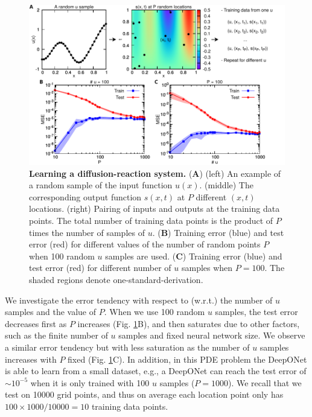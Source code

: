 \documentclass[11pt]{article}
\begin{document}
\begin{figure}[htbp]
\centering
\includegraphics{adr_error.pdf}
\caption{\textbf{Learning a diffusion-reaction system.} (\textbf{A}) (left) An example of a random sample of the input function $u(x)$. (middle) The corresponding output function $s(x,t)$ at $P$ different $(x,t)$ locations. (right) Pairing of inputs and outputs at the training data points. The total number of training data points is the product of $P$ times the number of samples of $u$. (\textbf{B}) Training error (blue) and test error (red) for different values of the number of random points $P$ when 100 random $u$ samples are used. (\textbf{C}) Training error (blue) and test error (red) for different number of $u$ samples when $P=100$. The shaded regions denote one-standard-derivation.}
\label{fig:adr_error}
\end{figure}

We investigate the error tendency with respect to (w.r.t.) the number of $u$ samples and the value of $P$. When we use 100 random $u$ samples, the test error decreases first as $P$ increases (Fig. \ref{fig:adr_error}B), and then saturates due to other factors, such as the finite number of $u$ samples and fixed neural network size. We observe a similar error tendency but with less saturation as the number of $u$ samples increases with $P$ fixed (Fig. \ref{fig:adr_error}C). In addition, in this PDE problem the DeepONet is able to learn from a small dataset, e.g., a DeepONet can reach the test error of $\sim 10^{-5}$ when it is only trained with 100 $u$ samples ($P=1000$). We recall that we test on 10000 grid points, and thus on average each location point only has $100 \times 1000 / 10000 = 10$ training data points.
\end{document}
